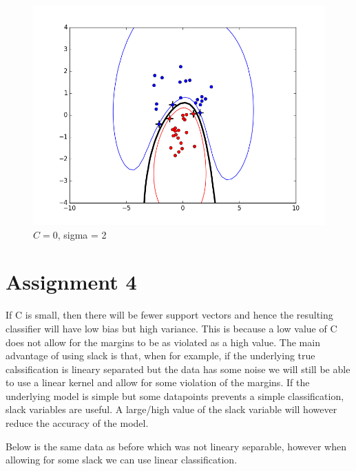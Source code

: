 \documentclass{article}
\begin{document}
\begin{figure}[H]
\centering
\includegraphics[scale = 0.5]{figure_radial_sigma2.png}
\caption{$C=0$, sigma = 2}
\label{fig:6}
\end{figure}

\section*{Assignment 4}

If C is small, then there will be fewer support vectors and hence the resulting classifier will have low bias but
high variance. This is because a low value of C does not allow for the margins to be as violated as a high value. 
The main advantage of using slack is that, when for example, if the underlying true calssification is lineary separated 
but the data has some noise we will still be able to use a linear kernel and allow for some violation of the margins. 
If the underlying model is simple but some datapoints prevents a simple classification, slack variables are useful. 
A large/high value of the slack variable will however reduce the accuracy of the model. 

Below is the same data as before which was not lineary separable, however when allowing for some slack we can use linear classification. 
\end{document}
